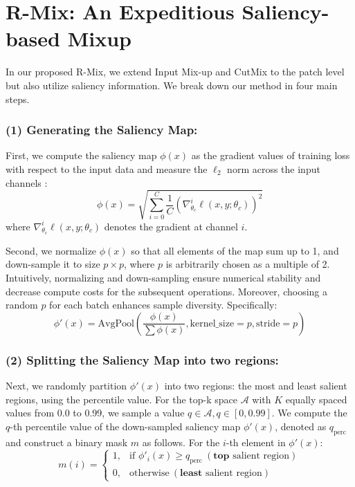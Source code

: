 \documentclass[letterpaper]{article} \usepackage[submission]{aaai23}  \usepackage{times}  \usepackage{helvet}  \usepackage{courier}  \usepackage[hyphens]{url}  \usepackage{graphicx} \urlstyle{rm} \def\UrlFont{\rm}  \usepackage{natbib}  \usepackage{caption} \frenchspacing  \setlength{\pdfpagewidth}{8.5in} \setlength{\pdfpageheight}{11in}
\newcommand{\mixup}{Input Mix-up}
\newcommand{\cutmix}{{CutMix}}
\newcommand{\rrlmix}{{R-Mix}}
\begin{document}
\section{R-Mix: An Expeditious Saliency-based Mixup}
\label{sec:method}
In our proposed \rrlmix{}, we extend \mixup{} and \cutmix{} to the patch level but also utilize saliency information. We break down our method in four main steps.

\subsubsection{(1) Generating the Saliency Map:} First, we compute the saliency map $\phi(x)$ as the gradient values of training loss with respect to the input data and measure the $\ell_2$ norm across the input channels \cite{simonyan2014sal}:
\begin{equation}
\label{saliency}
    \phi(x) = \sqrt{\sum_{i=0}^C \frac{1}{C} (\nabla^i_{\theta_c}\ell (x, y;\theta_c))^2}
\end{equation}
where $\nabla^i_{\theta_c} \ell (x, y;\theta_c)$ denotes the gradient at channel $i$. 


Second, we normalize $\phi(x)$ so that all elements of the map sum up to 1, and down-sample it to size $p \times p$, where $p$ is arbitrarily chosen as a multiple of 2. Intuitively, normalizing and down-sampling ensure numerical stability and decrease compute costs for the subsequent operations. Moreover, choosing a random $p$ for each batch enhances sample diversity. Specifically:
\begin{equation}
\label{downsample}
    \phi'(x) = \text{AvgPool}\left(\frac{\phi(x)}{\sum \phi(x)}, \text{kernel\_size} = p, \text{stride}=p \right)
\end{equation}


\subsubsection{(2) Splitting the Saliency Map into two regions:} Next, we randomly partition $\phi'(x)$ into two regions: the most and least salient regions, using the percentile value. For the top-k space $\mathcal{A}$ with $K$ equally spaced values from 0.0 to 0.99, we sample a value $q \in \mathcal{A}, q \in [0, 0.99]$. We compute the $q$-th percentile value of the down-sampled saliency map $\phi'(x)$, denoted as $q_{\text{perc}}$ and construct a binary mask $m$ as follows. For the $i$-th element in $\phi'(x)$:
\begin{equation}
\label{mask}
m(i)= 
    \begin{cases}
    1, & \text{if } \phi'_i(x) \geq q_{\text{perc}} ~(\textbf{top} \text{ salient region}) \\
    0, & \text{otherwise} ~(\textbf{least}  \text{ salient region})
    \end{cases}
\end{equation}
\end{document}
